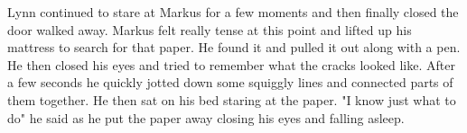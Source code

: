 \documentclass[12pt]{book}
\begin{document}
Lynn continued to stare at Markus for a few moments and then finally closed the door walked away. Markus felt really tense at this point and lifted up his mattress to search for that paper. He found it and pulled it out along with a pen. He then closed his eyes and tried to remember what the cracks looked like. After a few seconds he quickly jotted down some squiggly lines and connected parts of them together. He then sat on his bed staring at the paper. "I know just what to do" he said as he put the paper away closing his eyes and falling asleep.
\end{document}

